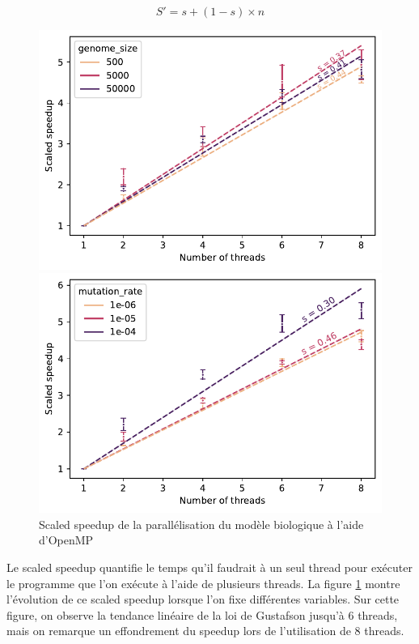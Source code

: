 \documentclass[a4paper, 10pt, twoside]{article}
\begin{document}
$$ S' = s + (1 - s) \times n$$

\begin{figure}[htb]
	\centering
	\begin{minipage}{0.45\textwidth}
		\centering
		\includegraphics[width=\textwidth]{img/weak_speedup_genome_size.pdf}
	\end{minipage}
	\begin{minipage}{0.45\textwidth}
		\includegraphics[width=\textwidth]{img/weak_speedup_mutation_rate.pdf}
	\end{minipage}
	\caption{Scaled speedup de la parallélisation du modèle biologique à l'aide d'OpenMP}
	\label{fig:scaled-speedup/omp}
\end{figure}

Le scaled speedup quantifie le temps qu'il faudrait à un seul thread pour exécuter le programme que l'on exécute à l'aide de plusieurs threads. La figure \ref{fig:scaled-speedup/omp} montre l'évolution de ce scaled speedup lorsque l'on fixe différentes variables. Sur cette figure, on observe la tendance linéaire de la loi de Gustafson jusqu'à 6 threads, mais on remarque un effondrement du speedup lors de l'utilisation de 8 threads.
\end{document}
